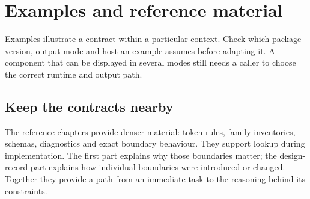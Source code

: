 \section*{Examples and reference material}

Examples illustrate a contract within a particular context. Check which package version, output mode and host an example assumes before adapting it. A component that can be displayed in several modes still needs a caller to choose the correct runtime and output path.

\subsection*{Keep the contracts nearby}

The reference chapters provide denser material: token rules, family inventories, schemas, diagnostics and exact boundary behaviour. They support lookup during implementation. The first part explains why those boundaries matter; the design-record part explains how individual boundaries were introduced or changed. Together they provide a path from an immediate task to the reasoning behind its constraints.
